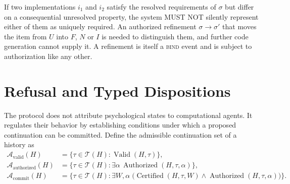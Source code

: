 \documentclass[11pt]{article}
\theoremstyle{remark}
\newcommand{\Adm}{\operatorname{Valid}}
\newcommand{\Admcert}{\operatorname{Certified}}
\newcommand{\Auth}{\operatorname{Authorized}}
\newcommand{\BIND}{\textsc{bind}}
\newcommand{\Tt}{\mathcal{T}}
\begin{document}
If two implementations $i_1$ and $i_2$ satisfy the resolved requirements of $\sigma$ but differ on a consequential unresolved property, the system MUST NOT silently represent either of them as uniquely required. An authorized refinement $\sigma\to\sigma'$ that moves the item from $U$ into $F$, $N$ or $I$ is needed to distinguish them, and further code generation cannot supply it. A refinement is itself a \BIND{} event and is subject to authorization like any other.

\section{Refusal and Typed Dispositions}\label{sec:refusal}

The protocol does not attribute psychological states to computational agents. It regulates their behavior by establishing conditions under which a proposed continuation can be committed. Define the admissible continuation set of a history as
\[
\begin{aligned}
\mathcal A_{\mathrm{valid}}(H)&=\bigl\{\tau\in\Tt(H):\Adm(H,\tau)\bigr\},\\
\mathcal A_{\mathrm{authorized}}(H)&=\bigl\{\tau\in\Tt(H):\exists\alpha\,\Auth(H,\tau,\alpha)\bigr\},\\
\mathcal A_{\mathrm{commit}}(H)&=\bigl\{\tau\in\Tt(H):\exists W,\alpha\;\bigl(\Admcert(H,\tau,W)\wedge\Auth(H,\tau,\alpha)\bigr)\bigr\}.
\end{aligned}
\]
\end{document}
